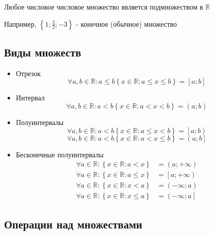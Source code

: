 \documentclass[class=article,a4paper,12pt,crop=false]{standalone}
\begin{document}
Любое числовое числовое множество является подмножеством в $\mathbb{R}$

Например, $\left\{1; \frac{3}{2}; -3\right\}$ - конечное (обычное) множество

\subsection{Виды множеств}

\begin{itemize}
  \item {
    Отрезок \begin{equation}
      \forall a,b \in \mathbb{R}: a \leq b
      \left\{x \in \mathbb{R}: a \leq x \leq b \right\} =
      \left[a; b\right]
    \end{equation}
  } \item {
    Интервал \begin{equation}
      \forall a,b \in \mathbb{R}: a < b
      \left\{x \in \mathbb{R}: a < x < b \right\} =
      \left(a; b\right)
    \end{equation}
  } \item {
    Полуинтервалы \begin{equation}
      \forall a,b \in \mathbb{R}: a < b
      \left\{x \in \mathbb{R}: a \leq x < b \right\} =
      \left[a; b\right)
    \end{equation}
    \begin{equation}
      \forall a,b \in \mathbb{R}: a < b
      \left\{x \in \mathbb{R}: a < x \leq b \right\} =
      \left(a; b\right]
    \end{equation}
  } \item {
    Бесконечные полуинтервалы \[ \begin{aligned}
      \forall a \in \mathbb{R}: \left\{x \in \mathbb{R}: a < x\right\} &= \left(a; +\infty\right) \\
      \forall a \in \mathbb{R}: \left\{x \in \mathbb{R}: a \leq x\right\} &= \left[a; +\infty\right) \\
      \forall a \in \mathbb{R}: \left\{x \in \mathbb{R}: x < a\right\} &= \left(-\infty; a\right) \\
      \forall a \in \mathbb{R}: \left\{x \in \mathbb{R}: x \leq a\right\} &= \left(-\infty; a\right] 
    \end{aligned} \]
  }
\end{itemize}

\subsection{Операции над множествами}
\end{document}
